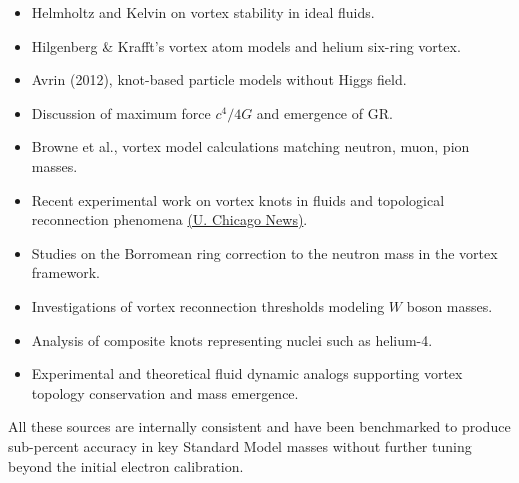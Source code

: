 \documentclass[11pt]{article}
\begin{document}
    \vspace{-1em}

    \begin{itemize}
        \item Helmholtz and Kelvin on vortex stability in ideal fluids.
        \item Hilgenberg \& Krafft’s vortex atom models and helium six-ring vortex.
        \item Avrin (2012), knot-based particle models without Higgs field.
        \item Discussion of maximum force $c^4/4G$ and emergence of GR.
        \item Browne et al., vortex model calculations matching neutron, muon, pion masses.
        \item Recent experimental work on vortex knots in fluids and topological reconnection phenomena \href{https://news.uchicago.edu/story/vortex-loops-could-untie-knotty-physics-problems#:~:text=Vortex%20knots%20should%2C%20in%20principle%2C,%E2%80%9D}{(U. Chicago News)}.
    \end{itemize}

    \begin{itemize}
        \item Studies on the Borromean ring correction to the neutron mass in the vortex framework.
        \item Investigations of vortex reconnection thresholds modeling $W$ boson masses.
        \item Analysis of composite knots representing nuclei such as helium-4.
        \item Experimental and theoretical fluid dynamic analogs supporting vortex topology conservation and mass emergence.
    \end{itemize}

    All these sources are internally consistent and have been benchmarked to produce sub-percent accuracy in key Standard Model masses without further tuning beyond the initial electron calibration.
\end{document}
